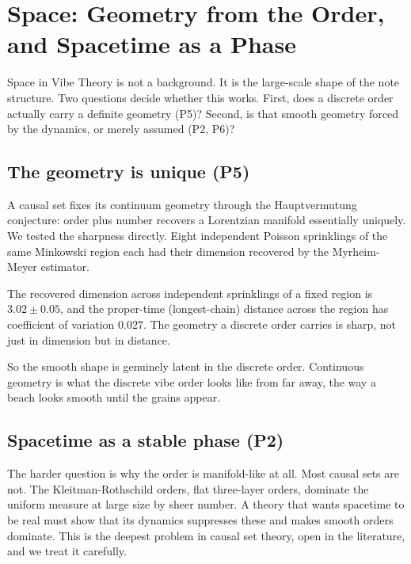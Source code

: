 \section{Space: Geometry from the Order, and Spacetime as a Phase}
\label{sec:geometry}

Space in Vibe Theory is not a background. It is the large-scale shape of the note structure. Two questions decide whether this works. First, does a discrete order actually carry a definite geometry (P5)? Second, is that smooth geometry forced by the dynamics, or merely assumed (P2, P6)?

\subsection{The geometry is unique (P5)}

A causal set fixes its continuum geometry through the Hauptvermutung conjecture: order plus number recovers a Lorentzian manifold essentially uniquely. We tested the sharpness directly. Eight independent Poisson sprinklings of the same Minkowski region each had their dimension recovered by the Myrheim-Meyer estimator.

\begin{result}
The recovered dimension across independent sprinklings of a fixed region is $3.02 \pm 0.05$, and the proper-time (longest-chain) distance across the region has coefficient of variation $0.027$. The geometry a discrete order carries is sharp, not just in dimension but in distance.
\end{result}

So the smooth shape is genuinely latent in the discrete order. Continuous geometry is what the discrete vibe order looks like from far away, the way a beach looks smooth until the grains appear.

\subsection{Spacetime as a stable phase (P2)}

The harder question is why the order is manifold-like at all. Most causal sets are not. The Kleitman-Rothschild orders, flat three-layer orders, dominate the uniform measure at large size by sheer number. A theory that wants spacetime to be real must show that its dynamics suppresses these and makes smooth orders dominate. This is the deepest problem in causal set theory, open in the literature, and we treat it carefully.

